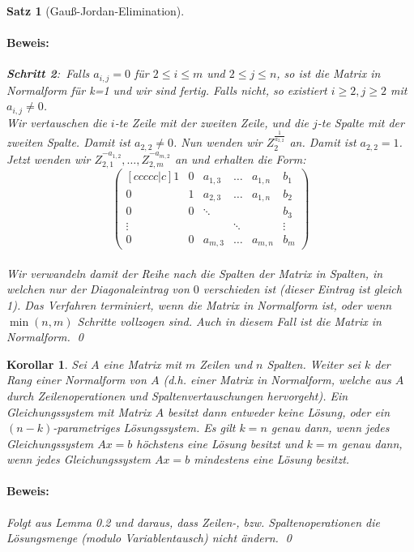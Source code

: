 \documentclass{report}
\theoremstyle{customrem}
\theoremstyle{customdef}
\newtheorem{korrolar}[definition]{Korollar}
\newtheorem{satz}[definition]{Satz}
\renewenvironment{proof}{\paragraph{Beweis: }}{\qed}
\begin{document}
\begin{satz}[Gauß-Jordan-Elimination]
\begin{proof}
			\textbf{Schritt 2}:\ Falls \(a_{i,j} = 0\) für \(2 \le i \le m\) und \(2 \le j \le n\), so ist die Matrix in Normalform für k=1 und wir sind fertig. Falls nicht, so existiert \(i \ge 2, j\ge 2\) mit \(a_{i,j} \neq 0\).\\
			Wir vertauschen die \(i\)-te Zeile mit der zweiten Zeile, und die \(j\)-te Spalte mit der zweiten Spalte. Damit ist \(a_{2,2} \neq 0\). Nun wenden wir \(Z_{2}^{\frac{1}{a_{2,2}}}\) an. Damit ist \(a_{2,2} = 1\). Jetzt wenden wir \(Z_{2,1}^{-a_{1,2}}, \dots, Z_{2,m}^{-a_{m,2}}\) an und erhalten die Form:
			\[
			\begin{pmatrix}[ccccc|c]
			1 & 0 & a_{1, 3} & \dots & a_{1, n} & b_1\\
			0 & 1 & a_{2, 3} & \dots & a_{1, n} & b_2\\
			0 & 0 & \ddots	 &		 & 			& b_3\\
			\vdots&&		 & \ddots&			& \vdots\\
			0 & 0 & a_{m, 3} & \dots & a_{m, n} & b_m
			\end{pmatrix}
			\]\\
			Wir verwandeln damit der Reihe nach die Spalten der Matrix in Spalten, in welchen nur der Diagonaleintrag von \(0\) verschieden ist (dieser Eintrag ist gleich 1).
			Das Verfahren terminiert, wenn die Matrix in Normalform ist, oder wenn \(\min(n, m)\) Schritte vollzogen sind. Auch in diesem Fall ist die Matrix in Normalform.
		\end{proof}
	\end{satz}
	\vspace{.2cm}
	\begin{korrolar}
		Sei \(A\) eine Matrix mit \(m\) Zeilen und \(n\) Spalten. Weiter sei \(k\) der Rang einer Normalform von \(A\) (d.h. einer Matrix in Normalform, welche aus \(A\) durch Zeilenoperationen und Spaltenvertauschungen hervorgeht). Ein Gleichungssystem  mit Matrix \(A\) besitzt dann entweder keine Lösung, oder ein \((n-k)\)-parametriges Lösungssystem. Es gilt \(k=n\) genau dann, wenn jedes Gleichungssystem \(Ax=b\) höchstens eine Lösung besitzt und \(k=m\) genau dann, wenn jedes Gleichungssystem \(Ax=b\) mindestens eine Lösung besitzt.\\
		\begin{proof}
			Folgt aus Lemma 0.2 und daraus, dass Zeilen-, bzw. Spaltenoperationen die Lösungsmenge (modulo Variablentausch) nicht ändern.
		\end{proof}
	\end{korrolar}
	\vspace{.2cm}
\end{document}
